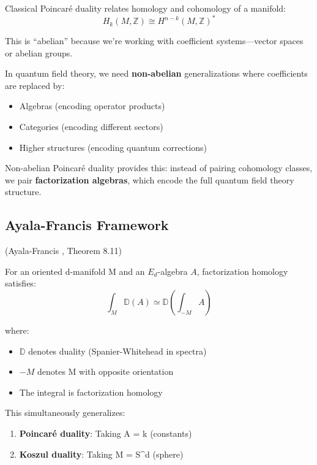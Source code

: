\begin{motivation}
Classical Poincaré duality relates homology and cohomology of a manifold:
$$H_k(M, \mathbb{Z}) \cong H^{n-k}(M, \mathbb{Z})^*$$

This is ``abelian'' because we're working with coefficient systems—vector spaces or abelian groups.

In quantum field theory, we need \textbf{non-abelian} generalizations where coefficients are replaced by:
\begin{itemize}
\item Algebras (encoding operator products)
\item Categories (encoding different sectors)
\item Higher structures (encoding quantum corrections)
\end{itemize}

Non-abelian Poincaré duality provides this: instead of pairing cohomology classes, we pair \textbf{factorization algebras}, which encode the full quantum field theory structure.
\end{motivation}

\subsection{Ayala-Francis Framework}

\begin{theorem}\label{thm:ayala-francis-NAP}
\textup{(Ayala-Francis \cite{AF15}, Theorem 8.11)}

For an oriented d-manifold M and an $E_d$-algebra $A$, factorization homology satisfies:
$$\int_M \mathbb{D}(A) \simeq \mathbb{D}\left(\int_{-M} A\right)$$

where:
\begin{itemize}
\item $\mathbb{D}$ denotes duality (Spanier-Whitehead in spectra)
\item $-M$ denotes M with opposite orientation
\item The integral is factorization homology
\end{itemize}

This simultaneously generalizes:
\begin{enumerate}
\item \textbf{Poincaré duality}: Taking A = k (constants)
\item \textbf{Koszul duality}: Taking M = S^d (sphere)
\end{enumerate}
\end{theorem}

